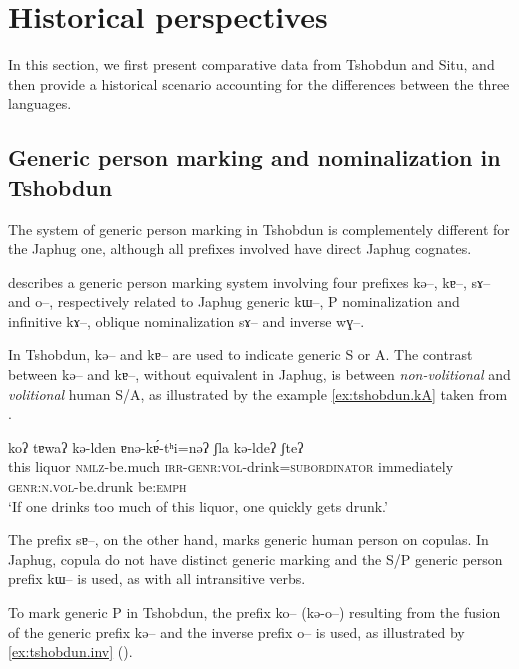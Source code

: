 \documentclass[oldfontcommands,oneside,a4paper,11pt]{article}
\newcommand{\ipa}[1]{{\phon \mbox{#1}}} %
\begin{document}
\section{Historical perspectives}
In this section, we first present comparative data from Tshobdun and Situ, and then provide a historical scenario accounting for the differences between the three languages.

\subsection{Generic person marking and nominalization in Tshobdun} \label{tshobdun.genr}
The system of generic person marking in Tshobdun is complementely different for the Japhug one, although all prefixes involved have direct Japhug cognates.

\citet{sun14generic} describes a generic person marking system involving four prefixes \ipa{kə--}, \ipa{kɐ--}, \ipa{sɤ--} and \ipa{o--}, respectively related to Japhug generic  \ipa{kɯ--}, P nominalization and infinitive \ipa{kɤ--}, oblique nominalization \ipa{sɤ--} and inverse \ipa{wɣ--}. 

In Tshobdun, \ipa{kə--} and \ipa{kɐ--} are used to indicate generic S or A. The contrast between \ipa{kə--} and \ipa{kɐ--}, without equivalent in Japhug, is between 	 \textit{non-volitional} and  \textit{volitional} human S/A, as illustrated by the   example \ref{ex:tshobdun.kA} taken from \citet[238]{sun14generic}.
 \begin{exe}
\ex \label{ex:tshobdun.kA}
\gll
\ipa{koʔ}  	\ipa{tɐwaʔ}  	\ipa{kə-lden}  	\ipa{ɐnə-kɐ́-tʰi=nəʔ}  	\ipa{ʃla}  	\ipa{kə-ldeʔ}  	\ipa{ʃteʔ}   \\
 this liquor \textsc{nmlz}-be.much \textsc{irr-genr:vol}-drink=\textsc{subordinator}  immediately \textsc{genr:n.vol}-be.drunk be:\textsc{emph} \\
\glt  ‘If one drinks too much of this liquor, one quickly gets drunk.’ 
 \end{exe}
 
 The prefix \ipa{sɐ--}, on the other hand, marks generic human person on copulas. In Japhug, copula do not have distinct generic marking and the S/P generic person prefix \ipa{kɯ--} is used, as with all intransitive verbs.
 
To mark generic P in Tshobdun, the prefix \ipa{ko--} (\ipa{kə-o--}) resulting from the  fusion  of  the generic prefix \ipa{kə--} and the inverse prefix \ipa{o--} is used, as illustrated by \ref{ex:tshobdun.inv} (\citealt[240]{sun14generic}).
\end{document}
